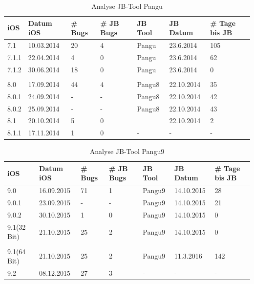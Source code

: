 \begin{table}[htp!]
    \begin{center}
        \begin{tabular}{| p{10mm} | p{18mm} | p{17mm} | p{25mm} | p{20mm} | p{22mm} | p{15mm} |} \hline
            \textbf{iOS} & \textbf{Datum iOS} & \textbf{\# Bugs} & \textbf{\# JB Bugs} & \textbf{JB Tool} & \textbf{JB Datum} & \textbf{\# Tage bis JB} \\ \hline 
7.1 & 10.03.2014 & 20 & 4 & Pangu & 23.6.2014 &105 \\ \hline
7.1.1 & 22.04.2014 & 4 & 0 & Pangu & 23.6.2014 & 62 \\ \hline
7.1.2 & 30.06.2014 & 18 & 0 & Pangu & 23.6.2014 & 0 \\ \hline
 & & & & & & \\ \hline
8.0 & 17.09.2014 & 44 & 4 & Pangu8 & 22.10.2014 & 35 \\ \hline
8.0.1 & 24.09.2014 & - & - & Pangu8 & 22.10.2014 & 42 \\ \hline
8.0.2 & 25.09.2014 & - & - & Pangu8 & 22.10.2014 & 43 \\ \hline
8.1 & 20.10.2014 & 5 & 0 & 	 & 22.10.2014 & 2 \\ \hline
8.1.1 & 17.11.2014 & 1 & 0 & - & - & - \\ \hline
     \end{tabular} 
        \caption{Analyse JB-Tool Pangu}
        \label{tab:AnalysePangu}
    \end{center}
\end{table}

\begin{table}[htp!]
    \begin{center}
        \begin{tabular}{| p{22mm} | p{18mm} | p{17mm} | p{25mm} | p{20mm} | p{22mm} | p{15mm} |} \hline
            \textbf{iOS} & \textbf{Datum iOS} & \textbf{\# Bugs} & \textbf{\# JB Bugs} & \textbf{JB Tool} & \textbf{JB Datum} & \textbf{\# Tage bis JB} \\ \hline 
9.0& 16.09.2015 & 71 & 1 & Pangu9 & 14.10.2015 & 28  \\ \hline
9.0.1 & 23.09.2015 & - & - & Pangu9 & 14.10.2015 & 21  \\ \hline
9.0.2 & 30.10.2015 & 1 & 0 & Pangu9 & 14.10.2015 & 0  \\ \hline 
9.1(32 Bit) & 21.10.2015 & 25 & 2 & Pangu9 & 14.10.2015 & 0  \\ \hline
		 & & & & & & \\ \hline				
9.1(64 Bit) & 21.10.2015 & 25 & 2 & Pangu9 & 11.3.2016 & 142  \\ \hline
9.2 & 08.12.2015	 & 27 & 3 & - & - & - \\ \hline		
\end{tabular} 
        \caption{Analyse JB-Tool Pangu9}
        \label{tab:AnalysePangu9}
    \end{center}
\end{table}


